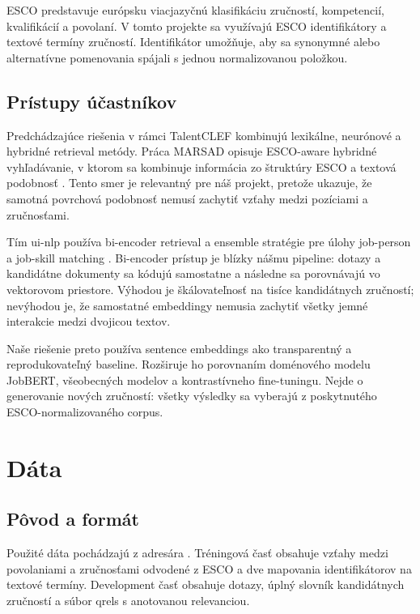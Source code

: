 \documentclass[12pt,a4paper]{article}
\newcommand{\code}[1]{\texttt{\detokenize{#1}}}
\begin{document}
ESCO predstavuje európsku viacjazyčnú klasifikáciu zručností, kompetencií,
kvalifikácií a povolaní. V tomto projekte sa využívajú ESCO identifikátory a
textové termíny zručností. Identifikátor umožňuje, aby sa synonymné alebo
alternatívne pomenovania spájali s jednou normalizovanou položkou.

\subsection{Prístupy účastníkov}

Predchádzajúce riešenia v rámci TalentCLEF kombinujú lexikálne, neurónové a
hybridné retrieval metódy. Práca MARSAD opisuje ESCO-aware hybridné
vyhľadávanie, v ktorom sa kombinuje informácia zo štruktúry ESCO a textová
podobnosť \parencite{IbrahimMARSADAT}. Tento smer je relevantný pre náš projekt,
pretože ukazuje, že samotná povrchová podobnosť nemusí zachytiť vzťahy medzi
pozíciami a zručnosťami.

Tím ui-nlp používa bi-encoder retrieval a ensemble stratégie pre úlohy
job-person a job-skill matching \parencite{LuthfiyyahuinlpAT}. Bi-encoder
prístup je blízky nášmu pipeline: dotazy a kandidátne dokumenty sa kódujú
samostatne a následne sa porovnávajú vo vektorovom priestore. Výhodou je
škálovateľnosť na tisíce kandidátnych zručností; nevýhodou je, že samostatné
embeddingy nemusia zachytiť všetky jemné interakcie medzi dvojicou textov.

Naše riešenie preto používa sentence embeddings ako transparentný a
reprodukovateľný baseline. Rozširuje ho porovnaním doménového modelu
JobBERT, všeobecných modelov a kontrastívneho fine-tuningu. Nejde o
generovanie nových zručností: všetky výsledky sa vyberajú z poskytnutého
ESCO-normalizovaného corpus.

\section{Dáta}

\subsection{Pôvod a formát}

Použité dáta pochádzajú z adresára \code{data/raw/TaskB}. Tréningová časť
obsahuje vzťahy medzi povolaniami a zručnosťami odvodené z ESCO a dve mapovania
identifikátorov na textové termíny. Development časť obsahuje dotazy, úplný
slovník kandidátnych zručností a súbor qrels s anotovanou relevanciou.
\end{document}

